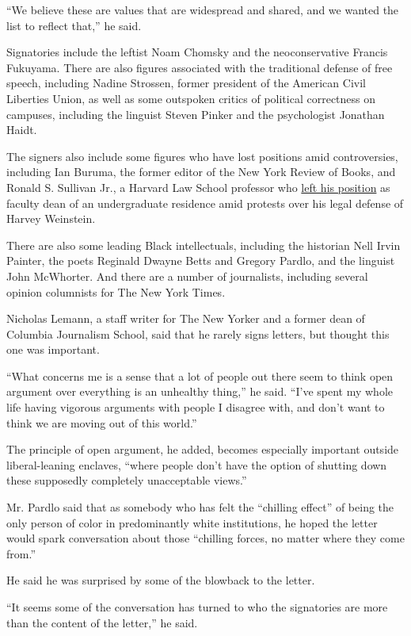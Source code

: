 ``We believe these are values that are widespread and shared, and we
wanted the list to reflect that,'' he said.

Signatories include the leftist Noam Chomsky and the neoconservative
Francis Fukuyama. There are also figures associated with the traditional
defense of free speech, including Nadine Strossen, former president of
the American Civil Liberties Union, as well as some outspoken critics of
political correctness on campuses, including the linguist Steven Pinker
and the psychologist Jonathan Haidt.

The signers also include some figures who have lost positions amid
controversies, including Ian Buruma, the former editor of the New York
Review of Books, and Ronald S. Sullivan Jr., a Harvard Law School
professor who
\href{https://www.nytimes.com/2019/05/11/us/ronald-sullivan-harvard.html}{left
his position} as faculty dean of an undergraduate residence amid
protests over his legal defense of Harvey Weinstein.

There are also some leading Black intellectuals, including the historian
Nell Irvin Painter, the poets Reginald Dwayne Betts and Gregory Pardlo,
and the linguist John McWhorter. And there are a number of journalists,
including several opinion columnists for The New York Times.

Nicholas Lemann, a staff writer for The New Yorker and a former dean of
Columbia Journalism School, said that he rarely signs letters, but
thought this one was important.

``What concerns me is a sense that a lot of people out there seem to
think open argument over everything is an unhealthy thing,'' he said.
``I've spent my whole life having vigorous arguments with people I
disagree with, and don't want to think we are moving out of this
world.''

The principle of open argument, he added, becomes especially important
outside liberal-leaning enclaves, ``where people don't have the option
of shutting down these supposedly completely unacceptable views.''

Mr. Pardlo said that as somebody who has felt the ``chilling effect'' of
being the only person of color in predominantly white institutions, he
hoped the letter would spark conversation about those ``chilling forces,
no matter where they come from.''

He said he was surprised by some of the blowback to the letter.

``It seems some of the conversation has turned to who the signatories
are more than the content of the letter,'' he said.

